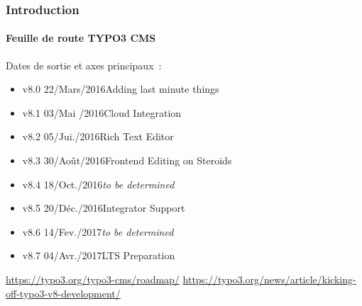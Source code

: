 \begin{frame}[fragile]
	\frametitle{Introduction}
	\framesubtitle{Feuille de route TYPO3 CMS}

	Dates de sortie et axes principaux~:

	\begin{itemize}

		\item v8.0 \tabto{1.1cm}22/Mars/2016\tabto{3.4cm}Adding last minute things
		\item
			\begingroup
				\color{typo3orange}
					v8.1 \tabto{1.1cm}03/Mai /2016\tabto{3.4cm}Cloud Integration
			\endgroup
		\item v8.2 \tabto{1.1cm}05/Jui./2016\tabto{3.4cm}Rich Text Editor
		\item v8.3 \tabto{1.1cm}30/Août/2016\tabto{3.4cm}Frontend Editing on Steroids
		\item v8.4 \tabto{1.1cm}18/Oct./2016\tabto{3.4cm}\textit{to be determined}
		\item v8.5 \tabto{1.1cm}20/Déc./2016\tabto{3.4cm}Integrator Support
		\item v8.6 \tabto{1.1cm}14/Fev./2017\tabto{3.4cm}\textit{to be determined}
		\item v8.7 \tabto{1.1cm}04/Avr./2017\tabto{3.4cm}LTS Preparation

	\end{itemize}

	\smaller
		\url{https://typo3.org/typo3-cms/roadmap/}\newline
		\url{https://typo3.org/news/article/kicking-off-typo3-v8-development/}
	\normalsize

\end{frame}

